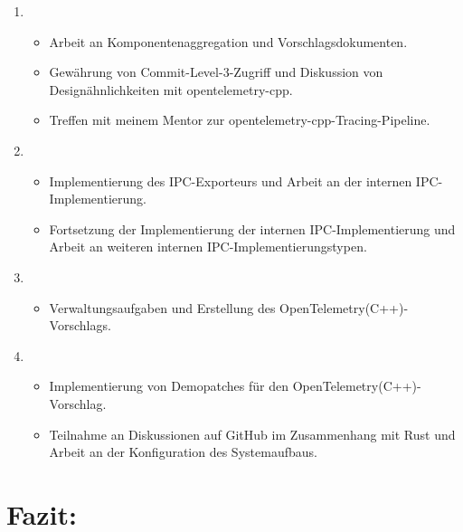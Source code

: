 \documentclass{article}
\begin{document}
\begin{enumerate}[label=\textbf{Woche \arabic*:}]
    \item {}
          \begin{itemize}
              \item Arbeit an Komponentenaggregation und Vorschlagsdokumenten.
              \item Gewährung von Commit-Level-3-Zugriff und Diskussion von
                    Designähnlichkeiten mit opentelemetry-cpp.
              \item Treffen mit meinem Mentor zur
                    opentelemetry-cpp-Tracing-Pipeline.
          \end{itemize}

    \item {}
          \begin{itemize}
              \item Implementierung des IPC-Exporteurs und Arbeit an der
                    internen IPC-Implementierung.
              \item Fortsetzung der Implementierung der internen
                    IPC-Implementierung und Arbeit an weiteren internen
                    IPC-Implementierungstypen.
          \end{itemize}

    \item {}
          \begin{itemize}
              \item Verwaltungsaufgaben und Erstellung des
                    OpenTelemetry(C++)-Vorschlags.
          \end{itemize}

    \item {}
          \begin{itemize}
              \item Implementierung von Demopatches für den
                    OpenTelemetry(C++)-Vorschlag.
              \item Teilnahme an Diskussionen auf GitHub im Zusammenhang mit
                    Rust und Arbeit an der Konfiguration des Systemaufbaus.
          \end{itemize}

\end{enumerate}

\section*{Fazit:}
\end{document}
